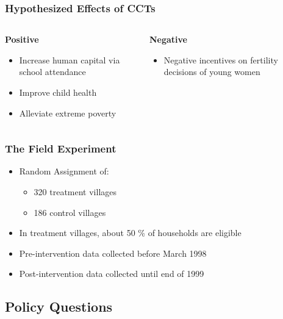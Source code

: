 \documentclass[11pt]{beamer}
\begin{document}
\begin{frame}[c]\frametitle{Hypothesized Effects of CCTs}
    \begin{columns}[t]
        \begin{column}{0.4\textwidth}
            \textcolor{sns-green}{
            \textbf{Positive}}
            \begin{itemize}
                \item \textcolor{sns-green}{Increase human capital via school attendance}
                \item \textcolor{sns-green}{Improve child health}
                \item \textcolor{sns-green}{Alleviate extreme poverty}
            \end{itemize}
        \end{column}
        \begin{column}{0.4\textwidth}
            \textcolor{sns-red}{\textbf{Negative}}
            \begin{itemize}
                \item \textcolor{sns-red}{Negative incentives on fertility decisions of young women}
            \end{itemize}
        \end{column}
    \end{columns}
\end{frame}


\begin{frame}[c]\frametitle{The Field Experiment}
    \begin{itemize}
        \item Random Assignment of:
        \begin{itemize}
            \item 320 treatment villages
            \item 186 control villages
        \end{itemize}
        \item In treatment villages, about 50 \% of households are eligible
        \item Pre-intervention data collected before March 1998
        \item Post-intervention data collected until end of 1999
    \end{itemize}
\end{frame}


\subsection{Policy Questions}
\end{document}
